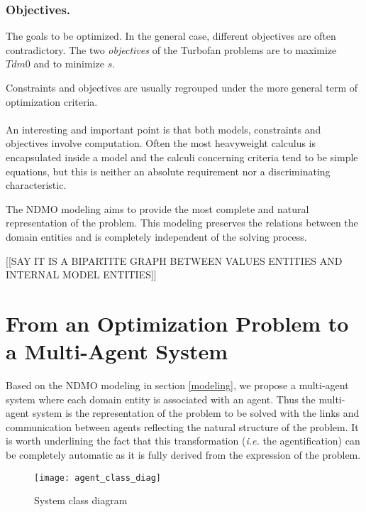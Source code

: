\subsubsection*{Objectives.}

The goals to be optimized. In the general case, different objectives are often contradictory.
The two \emph{objectives} of the Turbofan problems are to maximize $Tdm0$ and to minimize $s$.

Constraints and objectives are usually regrouped under the more general term of optimization criteria. 

\paragraph*{}
An interesting and important point is that both models, constraints and objectives involve computation. Often the most heavyweight calculus is encapsulated inside a model and the calculi concerning criteria tend to be simple equations, but this is neither an absolute requirement nor a discriminating characteristic.

The NDMO modeling aims to provide the most complete and natural representation of the problem. This modeling preserves the relations between the domain entities and is completely independent of the solving process. 

[[SAY IT IS A BIPARTITE GRAPH BETWEEN VALUES ENTITIES AND INTERNAL MODEL ENTITIES]]

\section{From an Optimization Problem to a Multi-Agent System}

Based on the NDMO modeling in section \ref{modeling}, we propose a multi-agent system where each domain entity is associated with an agent. Thus the multi-agent system is the representation of the problem to be solved with the links and communication between agents reflecting the natural structure of the problem. It is worth underlining the fact that this transformation (\textit{i.e.} the agentification) can be completely automatic as it is fully derived from the expression of the problem.

\begin{figure}
\texttt{[image: agent\_class\_diag]}
\caption{System class diagram}\label{SMA_class_diagram}

\end{figure}

